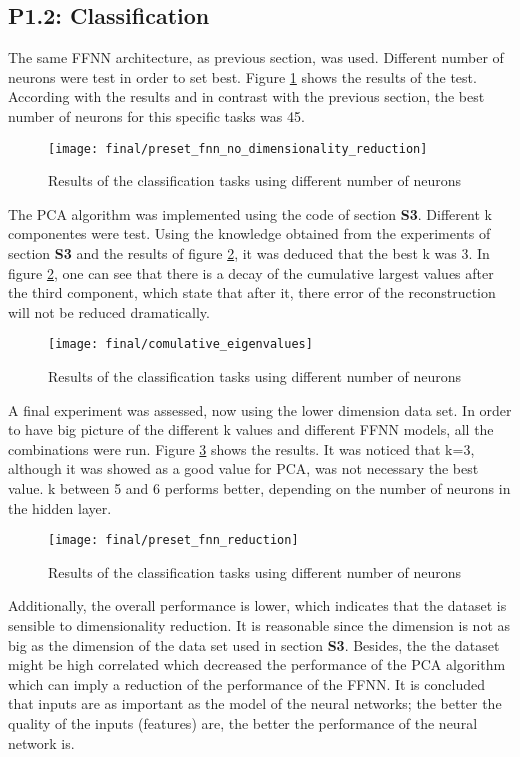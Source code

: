 \subsection{P1.2: Classification}
The same FFNN architecture, as previous section, was used. Different number of neurons were test in order to set best. Figure \ref{final_3__01} shows the results of the test. According with the results and in contrast with the previous section, the best number of neurons for this specific tasks was 45.
\bigbreak
\begin{figure}[!htbp]
\caption{Results of the classification tasks using different number of neurons}
\label{final_3__01}
\medbreak
\texttt{[image: final/preset\_fnn\_no\_dimensionality\_reduction]}
\centering
\end{figure}

The PCA algorithm was implemented using the code of section \textbf{S3}. Different k componentes were test. Using the knowledge obtained from the experiments of section \textbf{S3} and the results of figure \ref{final_3_2fff}, it was deduced that the best k was 3. In figure \ref{final_3_2fff}, one can see that there is a decay of the cumulative largest values after the third component, which state that after it, there error of the reconstruction will not be reduced dramatically.
\bigbreak
\begin{figure}[!htbp]
\caption{Results of the classification tasks using different number of neurons}
\label{final_3_2fff}
\medbreak
\texttt{[image: final/comulative\_eigenvalues]}
\centering
\end{figure}

A final experiment was assessed, now using the lower dimension data set. In order to have big picture of the different k values and different FFNN models, all the combinations were run. Figure \ref{final_3_3} shows the results. It was noticed that k=3, although it was showed as a good value for PCA, was not necessary the best value. k between 5 and 6 performs better, depending on the number of neurons in the hidden layer.
\bigbreak
\begin{figure}[!htbp]
\caption{Results of the classification tasks using different number of neurons}
\label{final_3_3}
\medbreak
\texttt{[image: final/preset\_fnn\_reduction]}
\centering
\end{figure}

Additionally, the overall performance is lower, which indicates that the dataset is sensible to dimensionality reduction. It is reasonable since the dimension is not as big as the dimension of the data set used in section \textbf{S3}. Besides, the the dataset might be high correlated which decreased the performance of the PCA algorithm which can imply a reduction of the performance of the FFNN. It is concluded that inputs are as important as the model of the neural networks; the better the quality of the inputs (features) are, the better the performance of the neural network is. 
\bigbreak
